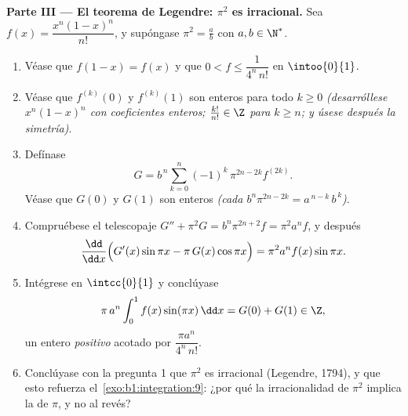 \begin{problem}
\medskip
\noindent\textbf{Parte III --- El teorema de Legendre: $\pi^2$ es
irracional.} Sea $f(x) = \dfrac{x^n (1 - x)^n}{n!}$, y supóngase
$\pi^2 = \frac ab$ con $a, b \in \N^*$.
\begin{enumerate}[resume]
  \item Véase que $f(1 - x) = f(x)$ y que
        $0 < f \leq \dfrac{1}{4^n\,n!}$ en $\intoo{0}{1}$.
  \item Véase que $f^{(k)}(0)$ y $f^{(k)}(1)$ son enteros para todo
        $k \geq 0$ \emph{(desarróllese $x^n(1-x)^n$ con coeficientes
        enteros; $\frac{k!}{n!} \in \Z$ para $k \geq n$; y úsese
        después la simetría)}.
  \item Defínase
        \[
        G = b^{\,n} \sum_{k=0}^{n} (-1)^k\,
        \pi^{2n - 2k} f^{(2k)} .
        \]
        Véase que $G(0)$ y $G(1)$ son enteros \emph{(cada
        $b^n \pi^{2n-2k} = a^{\,n-k}\,b^{\,k}$)}.
  \item Compruébese el telescopaje $G'' + \pi^2 G = b^n \pi^{2n+2} f
        = \pi^2 a^n f$, y después
        \[
        \frac{\dd}{\dd x}\Bigl(G'(x)\sin \pi x - \pi\,G(x)\cos
        \pi x\Bigr) = \pi^2 a^n f(x)\sin \pi x .
        \]
  \item Intégrese en $\intcc{0}{1}$ y conclúyase
        \[
        \pi\,a^n \int_0^1 f(x)\sin(\pi x)\,\dd x = G(0) + G(1)
        \in \Z ,
        \]
        un entero \emph{positivo} acotado por
        $\dfrac{\pi a^n}{4^n\,n!}$.
  \item Conclúyase con la pregunta 1 que $\pi^2$ es irracional
        (Legendre, 1794), y que esto refuerza
        el~\cref{exo:b1:integration:9}: ¿por qué la irracionalidad de
        $\pi^2$ implica la de $\pi$, y no al revés?
\end{enumerate}


\end{problem}
